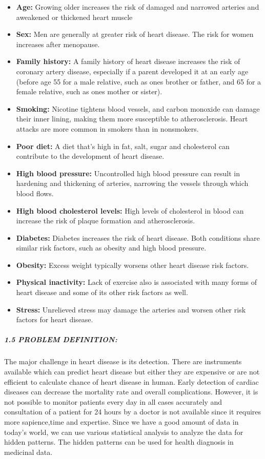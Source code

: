 \documentclass[
]{article}
\providecommand{\tightlist}{%
  \setlength{\itemsep}{0pt}\setlength{\parskip}{0pt}}
\begin{document}
\begin{itemize}
\tightlist
\item
  \textbf{Age:} Growing older increases the risk of damaged and narrowed
  arteries and aweakened or thickened heart muscle
\item
  \textbf{Sex:} Men are generally at greater risk of heart disease. The
  risk for women increases after menopause.
\item
  \textbf{Family history:} A family history of heart disease increases
  the risk of coronary artery disease, especially if a parent developed
  it at an early age (before age 55 for a male relative, such as ones
  brother or father, and 65 for a female relative, such as ones mother
  or sister).
\item
  \textbf{Smoking:} Nicotine tightens blood vessels, and carbon monoxide
  can damage their inner lining, making them more susceptible to
  atherosclerosis. Heart attacks are more common in smokers than in
  nonsmokers.
\item
  \textbf{Poor diet:} A diet that's high in fat, salt, sugar and
  cholesterol can contribute to the development of heart disease.
\item
  \textbf{High blood pressure:} Uncontrolled high blood pressure can
  result in hardening and thickening of arteries, narrowing the vessels
  through which blood flows.
\item
  \textbf{High blood cholesterol levels:} High levels of cholesterol in
  blood can increase the risk of plaque formation and atherosclerosis.
\item
  \textbf{Diabetes:} Diabetes increases the risk of heart disease. Both
  conditions share similar risk factors, such as obesity and high blood
  pressure.
\item
  \textbf{Obesity:} Excess weight typically worsens other heart disease
  risk factors.
\item
  \textbf{Physical inactivity:} Lack of exercise also is associated with
  many forms of heart disease and some of its other risk factors as
  well.
\item
  \textbf{Stress:} Unrelieved stress may damage the arteries and worsen
  other risk factors for heart disease.
\end{itemize}

\hypertarget{problem-definition}{%
\subparagraph{1.5 PROBLEM DEFINITION:}\label{problem-definition}}

The major challenge in heart disease is its detection. There are
instruments available which can predict heart disease but either they
are expensive or are not efficient to calculate chance of heart disease
in human. Early detection of cardiac diseases can decrease the mortality
rate and overall complications. However, it is not possible to monitor
patients every day in all cases accurately and consultation of a patient
for 24 hours by a doctor is not available since it requires more
sapience,time and expertise. Since we have a good amount of data in
today's world, we can use various statistical analysis to analyze the
data for hidden patterns. The hidden patterns can be used for health
diagnosis in medicinal data.
\end{document}
